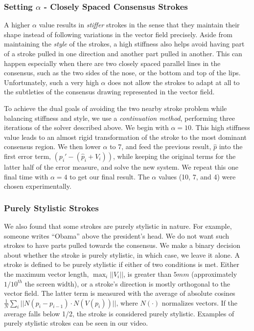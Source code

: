 \subsubsection{Setting $\alpha$ - Closely Spaced Consensus Strokes}

A higher $\alpha$ value results in {\em stiffer} strokes in the sense that they maintain their shape instead of following variations in the vector field precisely. Aside from maintaining the {\em style} of the strokes, a high stiffness also helps avoid having part of a stroke pulled in one direction and another part pulled in another. This can happen especially when there are two closely spaced parallel lines in the consensus, such as the two sides of the nose, or the bottom and top of the lips. Unfortunately, such a very high $\alpha$ does not allow the strokes to adapt at all to the subtleties of the consensus drawing represented in the vector field.

To achieve the dual goals of avoiding the two nearby stroke problem while balancing stiffness and style, we use a {\em continuation method}, performing three iterations of the solver described above. We begin with $\alpha=10$. This high stiffness value leads to an almost rigid transformation of the stroke to the most dominant consensus region. We then lower $\alpha$ to 7, and feed the previous result, $\hat{p}$ into the first error term, $(p_i' - (\hat{p}_i + V_i))$, while keeping the original terms for the latter half of the error measure, and solve the new system. We repeat this one final time with $\alpha=4$ to get our final result. The $\alpha$ values (10, 7, and 4) were chosen experimentally.

\subsubsection{Purely Stylistic Strokes}

We also found that some strokes are purely stylistic in nature. For example, someone writes ``Obama'' above the president's head. We do not want such strokes to have parts pulled towards the consensus. We make a binary decision about whether the stroke is purely stylistic, in which case, we leave it alone. A stroke is defined to be purely stylistic if either of two conditions is met. Either the maximum vector length, $\max_i||V_i||$, is greater than $5mm$ (approximately $1/10^{th}$ the screen width), or a stroke's direction is mostly orthogonal to the vector field. The latter term is measured with the average of absolute cosines $\frac{1}{N}\sum_i||N(p_i - p_{i-1}) \cdot N(V(p_i))||\textrm{,}$ where $N(\cdot)$ normalizes vectors. If the average falls below 1/2, the stroke is considered purely stylistic. Examples of purely stylistic strokes can be seen in our video.



